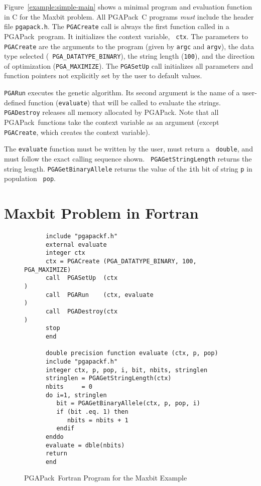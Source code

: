 \documentclass{report}
\newcommand{\pga}{PGAPack}
\begin{document}
Figure~\ref{example:simple-main} shows a minimal program and evaluation
function in C for the Maxbit problem.  All \pga\ C programs {\em must} include
the header file {\tt pgapack.h}. The {\tt PGACreate} call is always the first
function called in a \pga\ program.  It initializes the context variable, {\tt
ctx}.  The parameters to {\tt PGACreate} are the arguments to the program
(given by {\tt argc} and {\tt argv}), the data type selected ({\tt
PGA\_DATATYPE\_BINARY}), the string length ({\tt 100}), and the direction of
optimization ({\tt PGA\_MAXIMIZE}).  The {\tt PGASetUp} call initializes all
parameters and function pointers not explicitly set by the user to default
values.

{\tt PGARun} executes the genetic algorithm.  Its second argument is the name
of a user-defined function ({\tt evaluate}) that will be called to evaluate
the strings.  {\tt PGADestroy} releases all memory allocated by \pga.  Note
that all \pga\ functions take the context variable as an argument (except {\tt
PGACreate}, which creates the context variable).

The {\tt evaluate} function must be written by the user, must return a {\tt
double}, and must follow the exact calling sequence shown.  {\tt
PGAGetStringLength} returns the string length.  {\tt PGAGetBinaryAllele}
returns the value of the {\tt i}th bit of string {\tt p} in population {\tt
pop}.

\section{Maxbit Problem in Fortran}
\label{sec:simple-example-fortran} 

\begin{figure}
\begin{verbatim}
      include "pgapackf.h"
      external evaluate
      integer ctx
      ctx = PGACreate (PGA_DATATYPE_BINARY, 100, PGA_MAXIMIZE)
      call  PGASetUp  (ctx                                   )
      call  PGARun    (ctx, evaluate                         )
      call  PGADestroy(ctx                                   )
      stop
      end

      double precision function evaluate (ctx, p, pop)
      include "pgapackf.h"
      integer ctx, p, pop, i, bit, nbits, stringlen
      stringlen = PGAGetStringLength(ctx)
      nbits     = 0
      do i=1, stringlen
         bit = PGAGetBinaryAllele(ctx, p, pop, i)
         if (bit .eq. 1) then 
            nbits = nbits + 1
         endif
      enddo
      evaluate = dble(nbits)
      return
      end
\end{verbatim}
\caption{\pga\ Fortran Program for the Maxbit Example}
\label{example:maxbit-fortran}
\end{figure}
\end{document}
